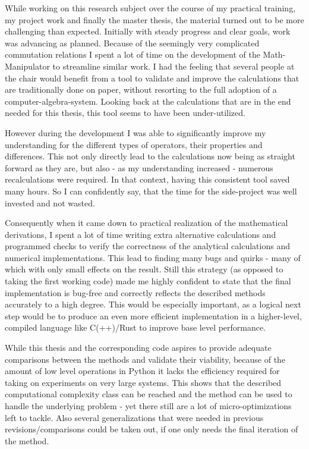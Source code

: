 While working on this research subject over the course of my practical training, my project work and finally the master thesis, the material turned out to be more challenging than expected.
Initially with steady progress and clear goals, work was advancing as planned.
Because of the seemingly very complicated commutation relations I spent a lot of time on the development of the Math-Manipulator to streamline similar work.
I had the feeling that several people at the chair would benefit from a tool to validate and improve the calculations that are traditionally done on paper, without resorting to the full adoption of a computer-algebra-system.
Looking back at the calculations that are in the end needed for this thesis, this tool seems to have been under-utilized.

However during the development I was able to significantly improve my understanding for the different types of operators, their properties and differences.
This not only directly lead to the calculations now being as straight forward as they are, but also - as my understanding increased - numerous recalculations were required.
In that context, having this consistent tool saved many hours.
So I can confidently say, that the time for the side-project was well invested and not wasted.

Consequently when it came down to practical realization of the mathematical derivations, I spent a lot of time writing extra alternative calculations and programmed checks to verify the correctness of the analytical calculations and numerical implementations.
This lead to finding many bugs and quirks - many of which with only small effects on the result. 
Still this strategy (as opposed to taking the first \glqq working\grqq{} code) made me highly confident to state that the final implementation is bug-free and correctly reflects the described methods accurately to a high degree.
This would be especially important, as a logical next step would be to produce an even more efficient implementation in a higher-level, compiled language like C(++)/Rust to improve base level performance.

While this thesis and the corresponding code aspires to provide adequate comparisons between the methods and validate their viability, because of the amount of low level operations in Python it lacks the efficiency required for taking on experiments on very large systems.
This shows that the described computational complexity class can be reached and the method can be used to handle the underlying problem - yet there still are a lot of micro-optimizations left to tackle.
Also several generalizations that were needed in previous revisions/comparisons could be taken out, if one only needs the final iteration of the method.

